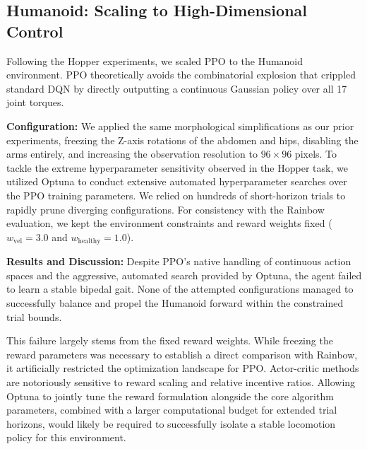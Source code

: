 \subsection{Humanoid: Scaling to High-Dimensional Control}
\label{sec:ppo_humanoid_results}

Following the Hopper experiments, we scaled PPO to the Humanoid environment. PPO theoretically avoids the combinatorial explosion that crippled standard DQN by directly outputting a continuous Gaussian policy over all 17 joint torques.

\textbf{Configuration:}
We applied the same morphological simplifications as our prior experiments, freezing the Z-axis rotations of the abdomen and hips, disabling the arms entirely, and increasing the observation resolution to $96 \times 96$ pixels. To tackle the extreme hyperparameter sensitivity observed in the Hopper task, we utilized Optuna to conduct extensive automated hyperparameter searches over the PPO training parameters. We relied on hundreds of short-horizon trials to rapidly prune diverging configurations. For consistency with the Rainbow evaluation, we kept the environment constraints and reward weights fixed ($w_{\text{vel}} = 3.0$ and $w_{\text{healthy}} = 1.0$).

\textbf{Results and Discussion:}
Despite PPO's native handling of continuous action spaces and the aggressive, automated search provided by Optuna, the agent failed to learn a stable bipedal gait. None of the attempted configurations managed to successfully balance and propel the Humanoid forward within the constrained trial bounds. 

This failure largely stems from the fixed reward weights. While freezing the reward parameters was necessary to establish a direct comparison with Rainbow, it artificially restricted the optimization landscape for PPO. Actor-critic methods are notoriously sensitive to reward scaling and relative incentive ratios. Allowing Optuna to jointly tune the reward formulation alongside the core algorithm parameters, combined with a larger computational budget for extended trial horizons, would likely be required to successfully isolate a stable locomotion policy for this environment.